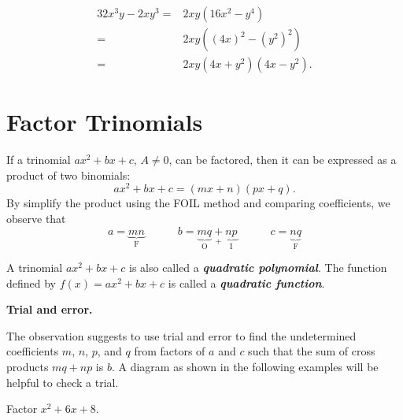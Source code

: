 \documentclass[
  en,11pt]{elegantbook}
\newcommand{\size}[2]{{\fontsize{#1}{0}\selectfont#2}}
\renewenvironment{example}[1][]{
  \refstepcounter{exam}
  \par\noindent\textbf{\color{main}{\examplename} \theexam #1}
  \rmfamily
}{
  \par\ignorespacesafterend
}
\newenvironment{rmdtip}{
	\vspace*{0.5\baselineskip}
	\par\noindent
	\makebox[-3pt][r]{\color{red!90}\size{12}{\HandRight}\,\,}
    \begin{tcolorbox}[
    enhanced,
    title={\textbf{\color{second}Tips}},
    title style={left color=blue!10!green!20!white,right color=yellow!20!blue!20!white},
    colback=cyan!10!white,
    ]
    \sffamily
}{
    \end{tcolorbox}
    \par\ignorespacesafterend
}
\begin{document}
\begin{solution}

\[
\begin{aligned}
    32x^3y-2xy^3
    =&2xy(16x^2-y^4)\\
    =&2xy((4x)^2-(y^2)^2)\\
    =&2xy(4x+y^2)(4x-y^2).
\end{aligned}
\]
\end{solution}

\hypertarget{factor-trinomials}{%
\section{Factor Trinomials}\label{factor-trinomials}}

If a trinomial \(ax^2+bx+c\), \(A\neq 0\), can be factored, then it can be expressed as a product of two binomials:\\
\[ax^2+bx+c=(mx+n)(px+q).\]
By simplify the product using the FOIL method and comparing coefficients, we observe that\\
\[
a=\underbrace{mn}_{\mathrm{F}}\quad\quad\quad
b=\underbrace{mq}_{\mathrm{O}}~\underset{+}{\underset{}{+}}~\underbrace{np}_{\mathrm{I}}
\quad\quad\quad
c=\underbrace{nq}_{\mathrm{F}}
\]

A trinomial \(ax^2+bx+c\) is also called a \textbf{\emph{quadratic polynomial}}. The function defined by \(f(x)=ax^2+bx+c\) is called a \textbf{\emph{quadratic function}}.

\begin{rmdtip}

\textbf{Trial and error.}

The observation suggests to use trial and error to find the undetermined coefficients \(m\), \(n\), \(p\), and \(q\) from factors of \(a\) and \(c\) such that the sum of cross products \(mq+np\) is \(b\). A diagram as shown in the following examples will be helpful to check a trial.

\end{rmdtip}

\begin{example}
Factor \(x^2+6x+8\).
\end{example}
\end{document}
